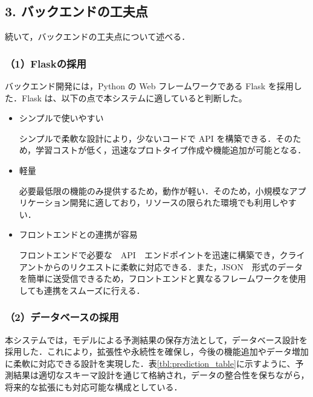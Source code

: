 \subsection*{3. バックエンドの工夫点}

続いて，バックエンドの工夫点について述べる．

\subsubsection*{（1）Flaskの採用}
バックエンド開発には，Python の Web フレームワークである Flask を採用した．Flask は、以下の点で本システムに適していると判断した。

\begin{itemize}
	\item シンプルで使いやすい
	
	シンプルで柔軟な設計により，少ないコードで API を構築できる．そのため，学習コストが低く，迅速なプロトタイプ作成や機能追加が可能となる．
	
	\item 軽量
	
	必要最低限の機能のみ提供するため，動作が軽い．そのため，小規模なアプリケーション開発に適しており，リソースの限られた環境でも利用しやすい．

	\item フロントエンドとの連携が容易
	 
	フロントエンドで必要な　API　エンドポイントを迅速に構築でき，クライアントからのリクエストに柔軟に対応できる．また，JSON　形式のデータを簡単に送受信できるため，フロントエンドと異なるフレームワークを使用しても連携をスムーズに行える．
\end{itemize}

\subsubsection*{（2）データベースの採用}
本システムでは，モデルによる予測結果の保存方法として，データベース設計を採用した．これにより，拡張性や永続性を確保し，今後の機能追加やデータ増加に柔軟に対応できる設計を実現した．表\ref{tbl:prediction_table}に示すように、予測結果は適切なスキーマ設計を通じて格納され，データの整合性を保ちながら，将来的な拡張にも対応可能な構成としている．

